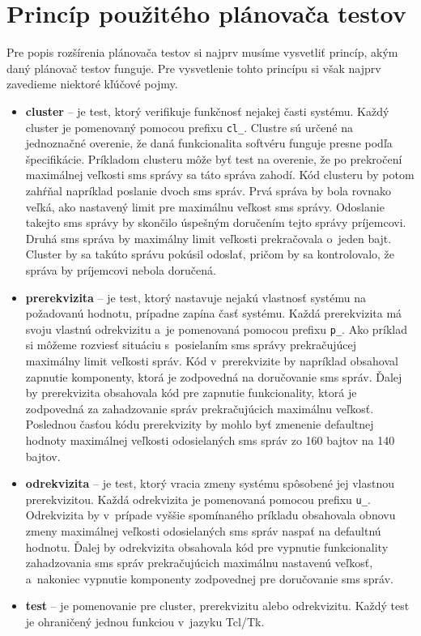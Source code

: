 \section{Princíp použitého plánovača testov} 
\label{sekcia:princip_pouziteho_planovaca}
Pre popis rozšírenia plánovača testov si najprv musíme vysvetliť princíp, 
akým daný plánovač testov funguje. Pre vysvetlenie tohto princípu si 
však najprv zavedieme niektoré kľúčové pojmy.

\begin{itemize}
\item \textbf{cluster} -- je test, ktorý verifikuje funkčnosť nejakej 
časti systému. Každý cluster je pomenovaný pomocou prefixu \texttt{cl\_}. 
Clustre sú určené na jednoznačné overenie, že daná funkcionalita softvéru
funguje presne podľa špecifikácie. Príkladom clusteru môže byť test na
overenie, že po prekročení maximálnej veľkosti sms správy sa táto správa 
zahodí. Kód clusteru by potom zahŕňal napríklad poslanie dvoch sms správ.
Prvá správa by bola rovnako veľká, ako nastavený limit pre maximálnu 
veľkost sms správy. 
Odoslanie takejto sms správy by skončilo úspešným doručením tejto správy
príjemcovi. 
Druhá sms správa by maximálny limit veľkosti prekračovala o~jeden bajt.
Cluster by sa takúto správu pokúsil odoslať, pričom by sa kontrolovalo,
že správa by príjemcovi nebola doručená.
\item \textbf{prerekvizita} -- je test, ktorý nastavuje nejakú vlastnosť 
systému na požadovanú hodnotu, prípadne zapína časť systému. 
Každá prerekvizita má svoju vlastnú odrekvizitu a~je pomenovaná pomocou 
prefixu \texttt{p\_}. Ako príklad si môžeme rozviesť situáciu s~posielaním
sms správy prekračujúcej maximálny limit veľkosti správ. Kód v~prerekvizite
by napríklad obsahoval zapnutie komponenty, ktorá je zodpovedná na doručovanie
sms správ. Ďalej by prerekvizita obsahovala kód pre zapnutie funkcionality,
ktorá je zodpovedná za zahadzovanie správ prekračujúcich maximálnu veľkosť.
Poslednou časťou kódu prerekvizity by mohlo byť zmenenie defaultnej hodnoty
maximálnej veľkosti odosielaných sms správ zo 160 bajtov na 140 bajtov.
\item \textbf{odrekvizita} -- je test, ktorý vracia zmeny systému 
spôsobené jej vlastnou prerekvizitou. Každá odrekvizita je pomenovaná
pomocou prefixu \texttt{u\_}. Odrekvizita by v~prípade vyššie spomínaného 
príkladu obsahovala obnovu zmeny maximálnej veľkosti odosielaných sms správ
naspať na defaultnú hodnotu. Ďalej by odrekvizita obsahovala kód pre vypnutie 
funkcionality zahadzovania sms správ prekračujúcich maximálnu nastavenú 
veľkosť, a~nakoniec vypnutie komponenty zodpovednej pre doručovanie sms 
správ.
\item \textbf{test} -- je pomenovanie pre cluster, prerekvizitu alebo 
odrekvizitu. Každý test je ohraničený jednou funkciou
v~jazyku Tcl/Tk. 

\end{itemize}

